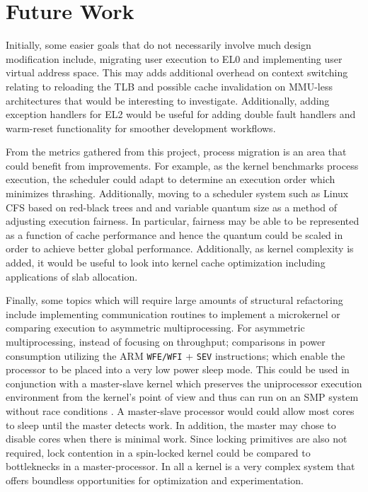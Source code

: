 \documentclass[11pt]{article}
\begin{document}
\section{Future Work}
\label{sec:future}
Initially, some easier goals that do not necessarily involve much design modification include, migrating user execution to EL0 and implementing user virtual address space.  This may adds additional overhead on context switching relating to reloading the TLB and possible cache invalidation on MMU-less architectures that would be interesting to investigate.  Additionally, adding exception handlers for EL2 would be useful for adding double fault handlers and warm-reset functionality for smoother development workflows.

From the metrics gathered from this project, process migration is an area that could benefit from improvements.  For example, as the kernel benchmarks process execution, the scheduler could adapt to determine an execution order which minimizes thrashing.  Additionally, moving to a scheduler system such as Linux CFS based on red-black trees and and variable quantum size as a method of adjusting execution fairness.  In particular, fairness may be able to be represented as a function of cache performance and hence the quantum could be scaled in order to achieve better global performance.  Additionally, as kernel complexity is added, it would be useful to look into kernel cache optimization including applications of slab allocation.

Finally, some topics which will require large amounts of structural refactoring include implementing communication routines to implement a microkernel or comparing execution to asymmetric multiprocessing.  For asymmetric multiprocessing, instead of focusing on throughput; comparisons in power consumption utilizing the ARM \texttt{WFE/WFI} + \texttt{SEV} instructions; which enable the processor to be placed into a very low power sleep mode.  This could be used in conjunction with a master-slave kernel which preserves the uniprocessor execution environment from the kernel's point of view and thus can run on an SMP system without race conditions \cite{unix}.  A master-slave processor would could allow most cores to sleep until the master detects work.  In addition, the master may chose to disable cores when there is minimal work.  Since locking primitives are also not required, lock contention in a spin-locked kernel could be compared to bottleknecks in a master-processor.  In all a kernel is a very complex system that offers boundless opportunities for optimization and experimentation.

\pagebreak
\begin{sloppypar}
	
	
\end{sloppypar}
\end{document}
